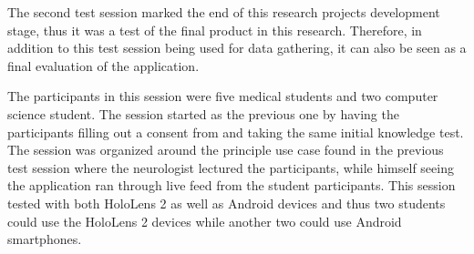 The second test session marked the end of this research projects development stage, thus it was a test of the final product in this research. Therefore, in addition to this test session being used for data gathering, it can also be seen as a final evaluation of the application. 

The participants in this session were five medical students and two computer science student. The session started as the previous one by having the participants filling out a consent from and taking the same initial knowledge test. 
The session was organized around the principle use case found in the previous test session where the neurologist lectured the participants, while himself seeing the application ran through live feed from the student participants.
This session tested with both HoloLens 2 as well as Android devices and thus two students could use the HoloLens 2 devices while another two could use Android smartphones.


